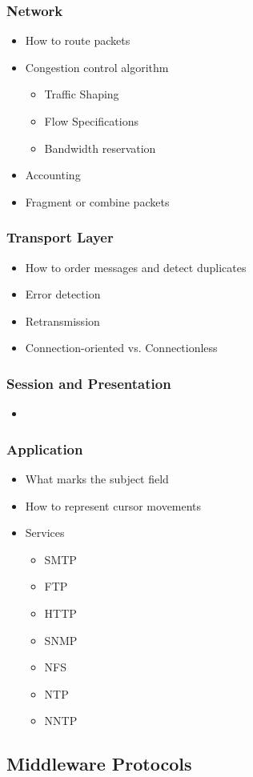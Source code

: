\subsubsection{Network}\label{subsubsec:Network_Protocols}
\begin{itemize}
\item How to route packets
\item Congestion control algorithm
\begin{itemize}
\item Traffic Shaping
\item Flow Specifications
\item Bandwidth reservation
\end{itemize}
\item Accounting
\item Fragment or combine packets
\end{itemize}

\subsubsection{Transport Layer}\label{subsubsec:Transport_Layer_Protocols}
\begin{itemize}
\item How to order messages and detect duplicates
\item Error detection
\item Retransmission
\item Connection-oriented vs. Connectionless
\end{itemize}

\subsubsection{Session and Presentation}\label{subsubsec:Session_Presentation_Protocols}
\begin{itemize}
\item
\end{itemize}

\subsubsection{Application}\label{subsubsec:Application_Protocols}
\begin{itemize}
\item What marks the subject field
\item How to represent cursor movements
\item Services
\begin{itemize}
\item SMTP
\item FTP
\item HTTP
\item SNMP
\item NFS
\item NTP
\item NNTP
\end{itemize}
\end{itemize}

\subsection{Middleware Protocols}\label{subsubsec:Middleware_Protocols}

